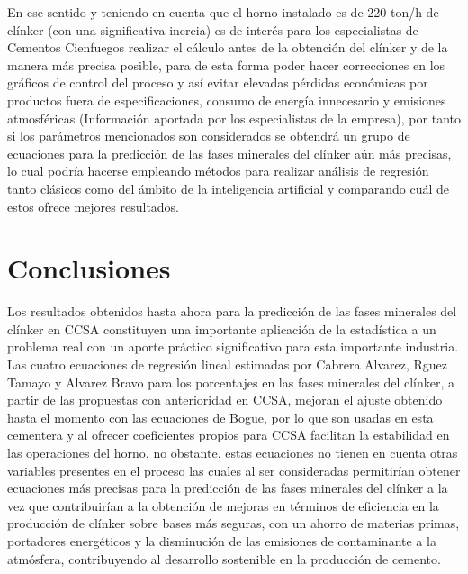 \documentclass[spanish]{report}
\begin{document}
En ese sentido y teniendo en cuenta que el horno instalado es de 220 ton/h de clínker (con una significativa inercia) es de interés para los especialistas  de Cementos Cienfuegos realizar el cálculo antes de la obtención del clínker y de la manera más precisa posible, para de esta forma poder hacer correcciones en los gráficos de control del proceso y así evitar elevadas pérdidas económicas por productos fuera de especificaciones, consumo de energía innecesario y emisiones atmosféricas (Información aportada por los especialistas de la empresa), por tanto si los parámetros mencionados son considerados se obtendrá un grupo de ecuaciones para la predicción de las fases minerales del clínker aún más precisas, lo cual podría hacerse empleando métodos  para realizar análisis de regresión tanto clásicos como del ámbito de la inteligencia artificial y comparando cuál de estos ofrece mejores resultados.


\section{Conclusiones}
Los resultados obtenidos hasta ahora para la predicción de las fases minerales del clínker en CCSA constituyen una importante aplicación de la estadística a un problema real con un aporte práctico significativo para esta importante industria. Las cuatro ecuaciones de regresión lineal estimadas por Cabrera Alvarez, Rguez Tamayo y Alvarez Bravo para los porcentajes en las fases minerales del clínker, a partir de las propuestas con anterioridad en CCSA, mejoran el ajuste obtenido hasta el momento con las ecuaciones de Bogue, por lo que son usadas en esta cementera y al ofrecer coeficientes propios para CCSA facilitan la estabilidad en las operaciones del horno, no obstante, estas ecuaciones no tienen en cuenta otras variables presentes en el proceso las cuales al ser consideradas permitirían obtener ecuaciones más precisas para la predicción de las fases minerales del clínker a la vez que contribuirían a la obtención de mejoras en términos de eficiencia en la producción de clínker sobre bases más seguras, con un ahorro de materias primas, portadores energéticos y la disminución de las emisiones de contaminante a la atmósfera, contribuyendo al desarrollo sostenible en la producción de cemento.





\end{document}
